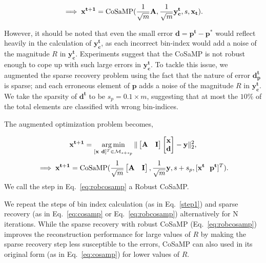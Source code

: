 \begin{equation}
\implies \mathbf{{x}^{t+1}} = \mathrm{CoSaMP}(\frac{1}{\sqrt{m}}\mathbf{A},\frac{1}{\sqrt{m}}\mathbf{y^t_c},s,\mathbf{x_t}).
\label{eq:cosamp}
\end{equation}


 However, it should be noted that even the small error $\mathbf{d} = \mathbf{p^t - p^*}$ would reflect heavily in the calculation of $\mathbf{y^t_c}$, as each incorrect bin-index would add a noise of the magnitude $R$ in $\mathbf{y^t_c}$. Experiments suggest that the CoSaMP is not robust enough to cope up with such large errors in $\mathbf{y^t_c}$. To tackle this issue, we augmented the sparse recovery problem using the fact that the nature of error $\mathbf{d^t_p}$ is sparse; and each erroneous element of $\mathbf{p}$ adds a noise of the magnitude $R$ in $\mathbf{y^t_c}$. We take the sparsity of $\mathbf{d^t}$ to be $s_p = 0.1\times m$, suggesting that at most the $10\%$ of the total elements are classified with wrong bin-indices.
 
 The augmented optimization problem becomes,
  
$$
\mathbf{{x}^{t+1}}=\argmin_{[\mathbf{x~d}]^T \in \mathcal{M}_{s+s_p}}\norm{\begin{bmatrix} \mathbf{A} & \mathbf{I} \end{bmatrix} \begin{bmatrix} \mathbf{x} \\ \mathbf{d} \end{bmatrix} - \mathbf{y}}_2^2, %
$$
\begin{equation}
\implies \mathbf{{x^{t+1}}} = \mathrm{CoSaMP}(\frac{1}{\sqrt{m}}\begin{bmatrix} \mathbf{A} & \mathbf{I} \end{bmatrix},\frac{1}{\sqrt{m}}\mathbf{y},s+s_p,[\mathbf{x^t~~p^t}]^T).
\label{eq:robcosamp}
\end{equation}
We call the step in Eq.~\ref{eq:robcosamp} a Robust CoSaMP. 

We repeat the steps of bin index calculation (as in Eq.~\ref{step1}) and sparse recovery (as in Eq.~\ref{eq:cosamp} or Eq.~\ref{eq:robcosamp}) alternatively for $\mathrm{N}$ iterations. While the sparse recovery with robust CoSaMP (Eq.~\ref{eq:robcosamp}) improves the reconstruction performance for large values of $R$ by making the sparse recovery step less susceptible to the errors, CoSaMP can also used in its original form (as in Eq.~\ref{eq:cosamp}) for lower values of $R$.

